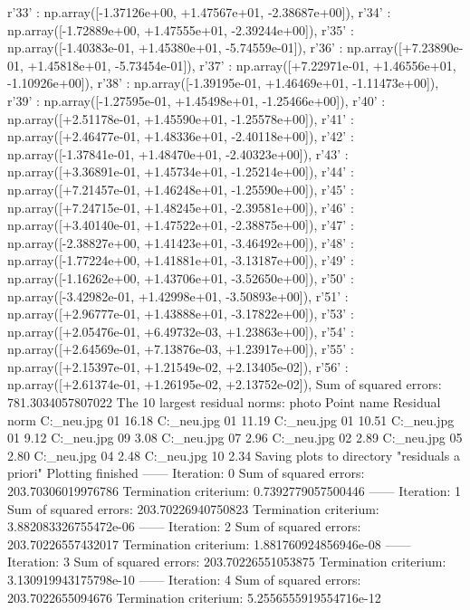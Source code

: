 r'33' : np.array([-1.37126e+00, +1.47567e+01, -2.38687e+00]),
r'34' : np.array([-1.72889e+00, +1.47555e+01, -2.39244e+00]),
r'35' : np.array([-1.40383e-01, +1.45380e+01, -5.74559e-01]),
r'36' : np.array([+7.23890e-01, +1.45818e+01, -5.73454e-01]),
r'37' : np.array([+7.22971e-01, +1.46556e+01, -1.10926e+00]),
r'38' : np.array([-1.39195e-01, +1.46469e+01, -1.11473e+00]),
r'39' : np.array([-1.27595e-01, +1.45498e+01, -1.25466e+00]),
r'40' : np.array([+2.51178e-01, +1.45590e+01, -1.25578e+00]),
r'41' : np.array([+2.46477e-01, +1.48336e+01, -2.40118e+00]),
r'42' : np.array([-1.37841e-01, +1.48470e+01, -2.40323e+00]),
r'43' : np.array([+3.36891e-01, +1.45734e+01, -1.25214e+00]),
r'44' : np.array([+7.21457e-01, +1.46248e+01, -1.25590e+00]),
r'45' : np.array([+7.24715e-01, +1.48245e+01, -2.39581e+00]),
r'46' : np.array([+3.40140e-01, +1.47522e+01, -2.38875e+00]),
r'47' : np.array([-2.38827e+00, +1.41423e+01, -3.46492e+00]),
r'48' : np.array([-1.77224e+00, +1.41881e+01, -3.13187e+00]),
r'49' : np.array([-1.16262e+00, +1.43706e+01, -3.52650e+00]),
r'50' : np.array([-3.42982e-01, +1.42998e+01, -3.50893e+00]),
r'51' : np.array([+2.96777e-01, +1.43888e+01, -3.17822e+00]),
r'53' : np.array([+2.05476e-01, +6.49732e-03, +1.23863e+00]),
r'54' : np.array([+2.64569e-01, +7.13876e-03, +1.23917e+00]),
r'55' : np.array([+2.15397e-01, +1.21549e-02, +2.13405e-02]),
r'56' : np.array([+2.61374e-01, +1.26195e-02, +2.13752e-02]),
Sum of squared errors: 781.3034057807022
The 10 largest residual norms:
photo	Point name	Residual norm
C:\Users\Clemens\Desktop\fotos_neu\1.jpg	01	16.18
C:\Users\Clemens\Desktop\fotos_neu\4.jpg	01	11.19
C:\Users\Clemens\Desktop\fotos_neu\2.jpg	01	10.51
C:\Users\Clemens\Desktop\fotos_neu\3.jpg	01	9.12
C:\Users\Clemens\Desktop\fotos_neu\4.jpg	09	3.08
C:\Users\Clemens\Desktop\fotos_neu\4.jpg	07	2.96
C:\Users\Clemens\Desktop\fotos_neu\1.jpg	02	2.89
C:\Users\Clemens\Desktop\fotos_neu\4.jpg	05	2.80
C:\Users\Clemens\Desktop\fotos_neu\3.jpg	04	2.48
C:\Users\Clemens\Desktop\fotos_neu\4.jpg	10	2.34
Saving plots to directory "residuals a priori"
Plotting finished
------ Iteration: 0
Sum of squared errors: 203.70306019976786
Termination criterium: 0.7392779057500446
------ Iteration: 1
Sum of squared errors: 203.70226940750823
Termination criterium: 3.882083326755472e-06
------ Iteration: 2
Sum of squared errors: 203.70226557432017
Termination criterium: 1.881760924856946e-08
------ Iteration: 3
Sum of squared errors: 203.70226551053875
Termination criterium: 3.130919943175798e-10
------ Iteration: 4
Sum of squared errors: 203.7022655094676
Termination criterium: 5.2556555919554716e-12
